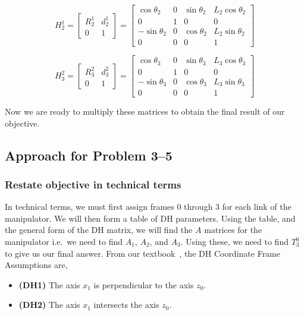 \documentclass[conference]{IEEEtran}
\begin{document}
\[
    H^1_2 = \begin{bmatrix}
        R^1_2 & d^1_2\\
        0 & 1
    \end{bmatrix}
    =
    \begin{bmatrix}
        \cos\theta _{2} & 0 & \sin\theta _{2} & L_{2} \cos\theta_2\\
        0 & 1 & 0 & 0\\
        -\sin\theta _{2} & 0 & \cos\theta_{2} & L_2 \sin\theta_2\\
        0 & 0 & 0 & 1
    \end{bmatrix}
\]

\[
    H^2_3 = \begin{bmatrix}
        R^2_3 & d^2_3\\
        0 & 1
    \end{bmatrix}
    =
    \begin{bmatrix}
        \cos\theta _{3} & 0 & \sin\theta _{3} & L_{3} \cos\theta_3\\
        0 & 1 & 0 & 0\\
        -\sin\theta _{3} & 0 & \cos\theta_{3} & L_3 \sin\theta_3\\
        0 & 0 & 0 & 1
    \end{bmatrix}
\]

Now we are ready to multiply these matrices to obtain the final result
of our objective.

\subsection{Approach for Problem 3--5}

\subsubsection{Restate objective in technical terms}
In technical terms, we must first assign frames 0 through 3 for
each link of the manipulator. We will then form a table of DH
parameters. Using the table, and the general form of the DH matrix,
we will find the $A$ matrices for the manipulator i.e.\ we need to find
$A_1$, $A_2$, and $A_3$. Using these, we need to find $T^0_3$
to give us our final answer. From our textbook~\cite{Spong2006}, the 
DH Coordinate Frame Assumptions are,
\begin{itemize}
    \item \textbf{(DH1)} The axis $x_1$ is perpendicular to the axis $z_0$.
    \item \textbf{(DH2)} The axis $x_1$ intersects the axis $z_0$.
\end{itemize}
\end{document}
